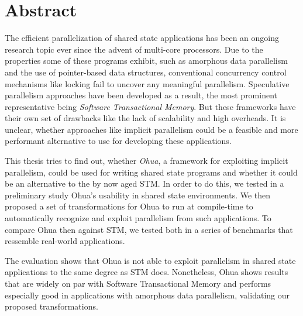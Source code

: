 %
\chapter*{Abstract}
\label{sec:abstract}

The efficient parallelization of shared state applications has been an ongoing research topic ever since the advent of multi-core processors.
Due to the properties some of these programs exhibit, such as amorphous data parallelism and the use of pointer-based data structures, conventional concurrency control mechanisms like locking fail to uncover any meaningful parallelism.
Speculative parallelism approaches have been developed as a result, the most prominent representative being \emph{Software Transactional Memory}.
But these frameworks have their own set of drawbacks like the lack of scalability and high overheads.
It is unclear, whether approaches like implicit parallelism could be a feasible and more performant alternative to use for developing these applications.

This thesis tries to find out, whether \emph{Ohua}, a framework for exploiting implicit parallelism, could be used for writing shared state programs and whether it could be an alternative to the by now aged STM.
In order to do this, we tested in a preliminary study Ohua's usability in shared state environments. %
We then proposed a set of transformations for Ohua to run at compile-time to automatically recognize and exploit parallelism from such applications.
To compare Ohua then against STM, we tested both in a series of benchmarks that ressemble real-world applications.

The evaluation shows that Ohua is not able to exploit parallelism in shared state applications to the same degree as STM does.
Nonetheless, Ohua shows results that are widely on par with Software Transactional Memory and performs especially good in applications with amorphous data parallelism, validating our proposed transformations.
